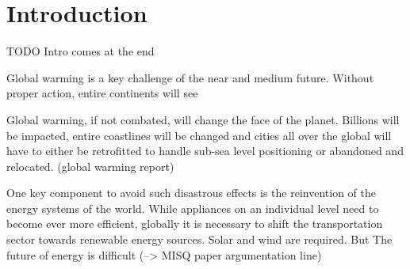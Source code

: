 \chapter{Introduction}

TODO Intro comes at the end




Global warming is a key challenge of the near and medium future. Without proper action, entire continents will see

Global warming, if not combated, will change the face of the planet. Billions will be impacted, entire coastlines will
be changed and cities all over the global will have to either be retrofitted to handle sub-sea level positioning or
abandoned and relocated. (global warming report)


One key component to avoid such disastrous effects is the reinvention of the energy systems of the world. While
appliances on an individual level need to become ever more efficient, globally it is necessary to shift the
transportation sector towards renewable energy sources.
Solar and wind
are required. But The future of energy is difficult (--> MISQ paper argumentation line)


